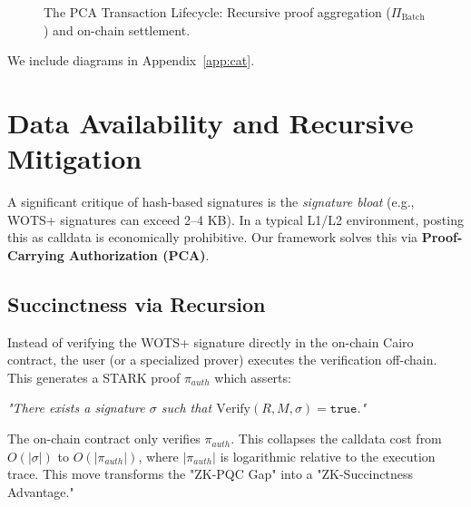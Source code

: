 \documentclass[conference]{IEEEtran}
\theoremstyle{definition}
\theoremstyle{plain}
\theoremstyle{remark}
\newcommand{\Verify}{\mathrm{Verify}}
\begin{document}
\begin{figure}[ht]
\centering
{}
\caption{The PCA Transaction Lifecycle: Recursive proof aggregation ($\Pi_{\text{Batch}}$) and on-chain settlement.}
\label{fig:pca_lifecycle}
\end{figure}

We include diagrams in Appendix~\ref{app:cat}.

\section{Data Availability and Recursive Mitigation}
A significant critique of hash-based signatures is the \emph{signature bloat} (e.g., WOTS+ signatures can exceed 2--4 KB). In a typical L1/L2 environment, posting this as calldata is economically prohibitive. Our framework solves this via \textbf{Proof-Carrying Authorization (PCA)}.

\subsection{Succinctness via Recursion}
Instead of verifying the WOTS+ signature directly in the on-chain Cairo contract, the user (or a specialized prover) executes the verification off-chain. This generates a STARK proof $\pi_{auth}$ which asserts: 
\begin{center}
\emph{"There exists a signature $\sigma$ such that $\Verify(R, M, \sigma) = \texttt{true}$."}
\end{center}
The on-chain contract only verifies $\pi_{auth}$. This collapses the calldata cost from $O(|\sigma|)$ to $O(|\pi_{auth}|)$, where $|\pi_{auth}|$ is logarithmic relative to the execution trace. This move transforms the "ZK-PQC Gap" into a "ZK-Succinctness Advantage."
\end{document}
